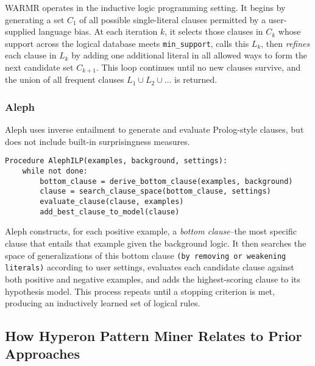 \documentclass{article}
\begin{document}
WARMR operates in the inductive logic programming setting.  It begins by generating a set $C_1$ of all possible single-literal clauses permitted by a user-supplied language bias.  At each iteration $k$, it selects those clauses in $C_k$ whose support across the logical database meets \texttt{min\_support}, calls this $L_k$, then \emph{refines} each clause in $L_k$ by adding one additional literal in all allowed ways to form the next candidate set $C_{k+1}$.  This loop continues until no new clauses survive, and the union of all frequent clauses $L_1 \cup L_2 \cup \dots$ is returned.

\subsubsection{Aleph}

Aleph \cite{srinivasan2002aleph} uses inverse entailment to generate and evaluate Prolog-style clauses, but does not include built-in surprisingness measures.

\begin{verbatim}
Procedure AlephILP(examples, background, settings):
    while not done:
        bottom_clause = derive_bottom_clause(examples, background)
        clause = search_clause_space(bottom_clause, settings)
        evaluate_clause(clause, examples)
        add_best_clause_to_model(clause)
\end{verbatim}

Aleph constructs, for each positive example, a \emph{bottom clause}--the most specific clause that entails that example given the background logic.  It then searches the space of generalizations of this bottom clause \texttt{(by removing or weakening literals)} according to user settings, evaluates each candidate clause against both positive and negative examples, and adds the highest-scoring clause to its hypothesis model.  This process repeats until a stopping criterion is met, producing an inductively learned set of logical rules.

\subsection{How Hyperon Pattern Miner Relates to Prior Approaches}
\end{document}
